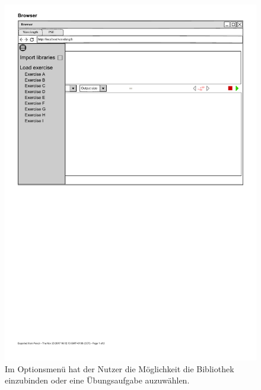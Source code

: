 \documentclass[parskip=full,11pt,twoside]{scrartcl}
\begin{document}
\begin{figure}[H]
	\centering
	\includegraphics[width=\textwidth]{img/wavelength_exercise_menu_open}
	\caption{\label{fig:exmenu}Im Optionsmenü hat der Nutzer die Möglichkeit die Bibliothek einzubinden oder eine Übungsaufgabe auzuwählen.}
\end{figure}
\end{document}
